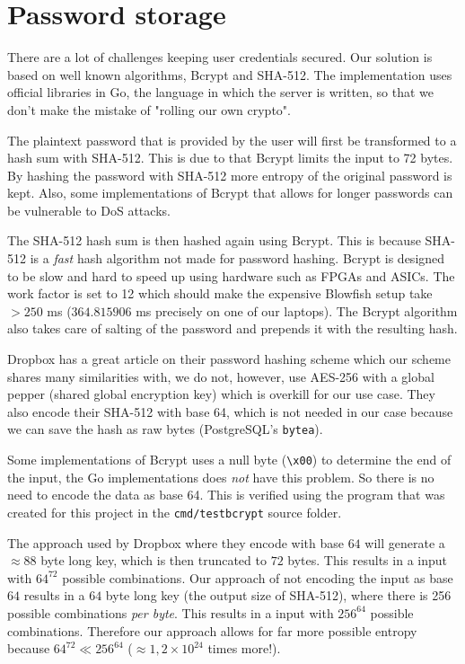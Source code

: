 \documentclass[12pt,a4paper]{report}
\begin{document}
\section{Password storage}
There are a lot of challenges keeping user credentials secured. Our solution is based on well known algorithms, Bcrypt and SHA-512. The implementation uses official libraries in Go, the language in which the server is written, so that we don't make the mistake of "rolling our own crypto".

The plaintext password that is provided by the user will first be transformed to a hash sum with SHA-512. This is due to that Bcrypt limits the input to 72 bytes. By hashing the password with SHA-512 more entropy of the original password is kept. Also, some implementations of Bcrypt that allows for longer passwords can be vulnerable to DoS attacks\cite{bcrypt-length}.

The SHA-512 hash sum is then hashed again using Bcrypt. This is because
SHA-512 is a \textit{fast} hash algorithm not made for password hashing. Bcrypt is
designed to be slow and hard to speed up using hardware such as FPGAs and
ASICs. The work factor is set to 12 which should make the expensive Blowfish
setup take $> 250$ ms ($364.815906$ ms precisely on one of our laptops).
The Bcrypt algorithm also takes care of salting of the password and prepends 
it with the resulting hash.

Dropbox has a great article\cite{dropbox-passwords} on their password hashing scheme which our
scheme shares many similarities with, we do not, however, use AES-256 with a
global pepper (shared global encryption key) which is overkill for our use
case. They also encode their SHA-512 with base 64, which is not needed in our
case because we can save the hash as raw bytes (PostgreSQL's \texttt{bytea}).

Some implementations of Bcrypt uses a null byte (\texttt{\textbackslash{}x00}) to determine the end
of the input\cite{bcrypt-bug}, the Go implementations does \textit{not} have this problem. So there
is no need to encode the data as base 64. This is verified using the program that was created for
this project in the \texttt{cmd/testbcrypt} source folder.

The approach used by Dropbox where they encode with base $64$ will generate a
$\approx 88$ byte long key, which is then truncated to $72$ bytes. This results in a
input with $64^{72}$ possible combinations. Our approach of not encoding the
input as base $64$ results in a $64$ byte long key (the output size of SHA-512),
where there is 256 possible combinations \textit{per byte}. This results in a input
with $256^{64}$ possible combinations. Therefore our approach allows for far more
possible entropy because $64^{72} \ll 256^{64}$ ($\approx 1,2 \times 10^{24}$ times more!).
\end{document}
